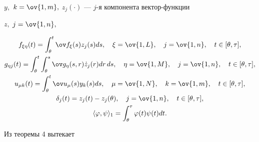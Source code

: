 $y,$ $k=\ov{1,m},$ $z_j(\cdot)$ --- $j$-я компонента вектор-функции


$z,$ $j=\ov{1,n},$


\begin{gather*}


f_{\xi \eta}(t) = \int_{\theta}^t \ov f_{\xi}(s)z_j(s)ds,\quad


\xi=\ov{1,L},\quad j=\ov{1,n},\quad t\in[\theta,\tau],\\


g_{\eta j}(t) = \int_{\theta}^t


\int_{\theta}^s \ov g_{\eta}(s,r)\Dot z_j(r)dr\,ds,\quad


\eta=\ov{1,M},\quad j=\ov{1,n},\quad t\in[\theta,\tau],\\


u_{\mu k}(t) = \int_{\theta}^t \ov u_{\mu}(s)y_k(s)ds,\quad


\mu=\ov{1,N},\quad k=\ov{1,m},\quad t\in[\theta,\tau],\\


\delta_j(t) = z_j(t)-z_j(\theta),\quad j=\ov{1,n},\quad


t\in[\theta,\tau],\\


\la \varphi,\psi\ra_1


= \int_{\theta}^{\tau} \varphi(t)\psi(t) dt.


\end{gather*}





Из теоремы 4 вытекает





